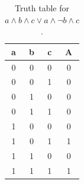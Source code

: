 \begin{table}[!tb]
    \centering
    \begin{tabular}{|c|c|c|c|}
        \hline
        \textbf{a} & \textbf{b} & \textbf{c} & \textbf{A} \\ \hline
        0 & 0 & 0 & 0 \\ \hline
        0 & 0 & 1 & 0 \\ \hline
        0 & 1 & 0 & 0 \\ \hline
        0 & 1 & 1 & 0 \\ \hline
        1 & 0 & 0 & 0 \\ \hline
        1 & 0 & 1 & 1 \\ \hline
        1 & 1 & 0 & 0 \\ \hline
        1 & 1 & 1 & 1 \\ \hline
    \end{tabular}
    \caption{Truth table for $a \land b \land c \lor a \land \lnot b \land c$.}
    \label{tab:truthtab}
\end{table}
